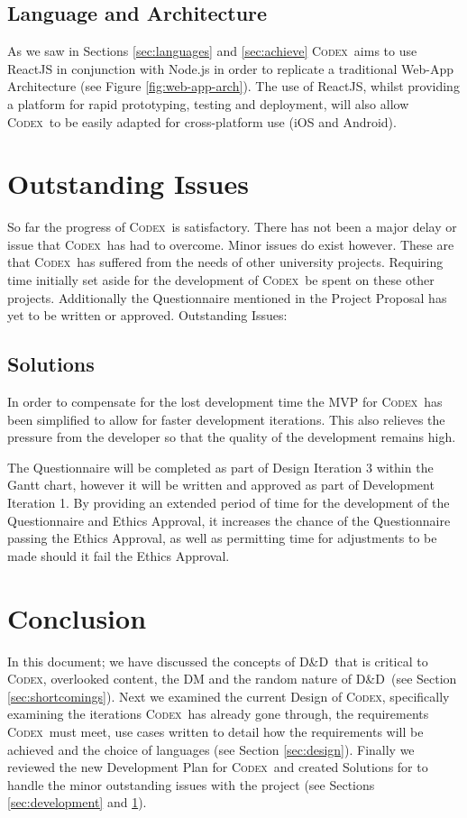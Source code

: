 \documentclass[progress]{cmpreport}
\newcommand{\dnd}{D\&D}
\newcommand{\Codex}{\textsc{Codex}}
\begin{document}
		\subsection{Language and Architecture} \label{sec:lang&arch}
		As we saw in Sections \ref{sec:languages} and \ref{sec:achieve} \Codex \ aims to use ReactJS in conjunction with Node.js in order to replicate a traditional Web-App Architecture (see Figure \ref{fig:web-app-arch}). The use of ReactJS, whilst providing a platform for rapid prototyping, testing and deployment, will also allow \Codex \ to be easily adapted for cross-platform use (iOS and Android). 
		
	\section{Outstanding Issues} \label{sec:Issues}
	So far the progress of \Codex \ is satisfactory. There has not been a major delay or issue that \Codex \ has had to overcome. Minor issues do exist however. These are that \Codex \ has suffered from the needs of other university projects. Requiring time initially set aside for the development of \Codex \ be spent on these other projects. Additionally the Questionnaire mentioned in the Project Proposal has yet to be written or approved. 
	Outstanding Issues:

		\subsection{Solutions} \label{sec:solutions}
		In order to compensate for the lost development time the MVP for \Codex \ has been simplified to allow for faster development iterations. This also relieves the pressure from the developer so that the quality of the development remains high.
		
		The Questionnaire will be completed as part of Design Iteration 3 within the Gantt chart, however it will be written and approved as part of Development Iteration 1. By providing an extended period of time for the development of the Questionnaire and Ethics Approval, it increases the chance of the Questionnaire passing the Ethics Approval, as well as permitting time for adjustments to be made should it fail the Ethics Approval.
		
	\section{Conclusion} \label{sec:conclusions}
	In this document; we have discussed the concepts of \dnd \ that is critical to \Codex, overlooked content, the DM and the random nature of \dnd \ (see Section \ref{sec:shortcomings}). Next we examined the current Design of \Codex, specifically examining the iterations \Codex \ has already gone through, the requirements \Codex \ must meet, use cases written to detail how the requirements will be achieved and the choice of languages (see Section \ref{sec:design}). Finally we reviewed the new Development Plan for \Codex \ and created Solutions for to handle the minor outstanding issues with the project (see Sections \ref{sec:development} and \ref{sec:Issues}).
\end{document}
